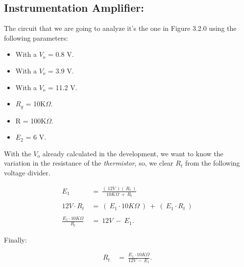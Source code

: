 \subsection{Instrumentation Amplifier:}

\setcounter{equation}{0}

The circuit that we are going to analyze it's the one in Figure 3.2.0 using the following parameters: \hfill \break

{\bfseries
\begin{itemize}
\item With a $V_{o}$ = 0.8 V.
\item With a $V_{o}$ = 3.9 V.
\item With a $V_{o}$ = 11.2 V.
\item $R_{g}$ = 10K$\Omega$.
\item R = 100K$\Omega$.
\item $E_{2}$ = 6 V.
\end{itemize}} \hfill

{\bfseries\itshape{}} \hfill

With the $V_{o}$ already calculated in the development, we want to know the variation in the resistance of the {\itshape thermistor}, so, we clear $R_{t}$ from the following voltage divider. \hfill \break \break

\begin{flushright}
{\bfseries\itshape{}} \hfill \break
\end{flushright}

\begin{ceqn}
\begin{align*}
E_{1}\ &=\ \frac{(\ 12 V\ )(\ R_{t}\ )}{10K\Omega\ +\ R_{t}} \\ \\
12V \cdot R_{t}\ &=\ (\ E_{1} \cdot 10K\Omega\ )\ +\ (\ E_{1} \cdot R_{t}\ ) \\ \\
\frac{E_{1} \cdot 10K\Omega}{R_{t}}\ &=\ 12V\ -\ E_{1}.
\end{align*}
\end{ceqn} \hfill \break

Finally:

\begin{ceqn}
\begin{align}
R_{t}\ &=\ \frac{E_{1} \cdot 10K\Omega}{12V\ -\ E_{1}}.
\end{align}
\end{ceqn} \hfill \break

